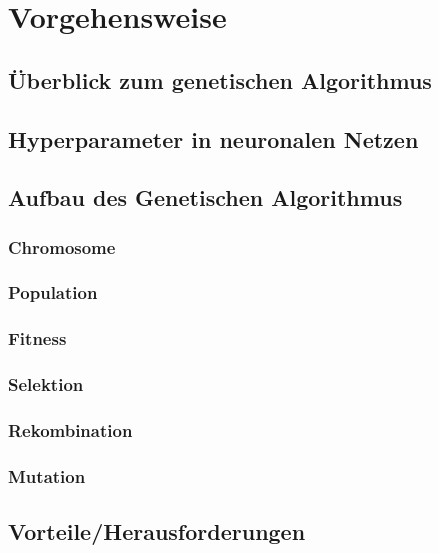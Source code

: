 \chapter{Vorgehensweise} 
\section{Überblick zum genetischen Algorithmus}
\section{Hyperparameter in neuronalen Netzen}
\section{Aufbau des Genetischen Algorithmus}
\subsection{Chromosome}
\subsection{Population}
\subsection{Fitness}
\subsection{Selektion}
\subsection{Rekombination}
\subsection{Mutation}
\section{Vorteile/Herausforderungen}